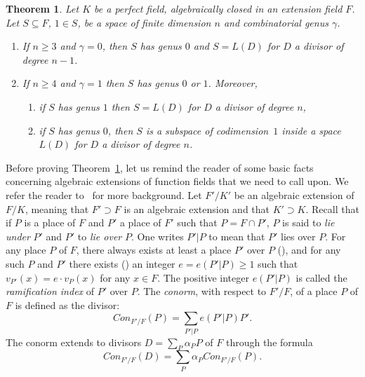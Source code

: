 \documentclass[10pt]{amsart}
\newtheorem{theo}{Theorem}[section]
\theoremstyle{definition}
\theoremstyle{remark}
\renewcommand{\geq}{\geqslant}
\begin{document}
\begin{theo}\label{thm:perfect}
Let $K$ be a perfect field, algebraically closed in an extension field $F$. Let $S \subseteq F$, $1\in S$, be a space of finite dimension $n$ and combinatorial genus $\gamma$.
\begin{enumerate}
\item \label{9.1} If $n\geq3$ and $\gamma=0$, then $S$ has genus $0$ and $S=L(D)$ for $D$ a divisor of degree $n-1$.
\item \label{9.2} If $n\geq4$ and $\gamma=1$ then $S$ has genus $0$ or $1$. Moreover,
\begin{enumerate}
\item if $S$ has genus $1$ then $S=L(D)$ for $D$ a divisor of degree $n$,
\item if $S$ has genus $0$, then $S$ is a subspace of codimension~$1$ inside a space $L(D)$ for $D$ a divisor of degree $n$.
\end{enumerate}
\end{enumerate}
\end{theo}

Before proving Theorem~\ref{thm:perfect}, let us remind the reader of some basic facts concerning algebraic extensions of function fields that we need to call upon. We refer the reader to~\cite[Chapter~III]{Stichtenoth} for more background. Let $F'/K'$ be an algebraic extension of $F/K$, meaning that $F'\supset F$ is an algebraic extension and that $K'\supset K$. Recall that if $P$ is a place of $F$ and $P'$ a place of $F'$ such that $P=F\cap P'$, $P$ is said to \emph{lie under} $P'$ and $P'$ to \emph{lie over} $P$. One writes $P'|P$ to mean that $P'$ lies over $P$. For any place $P$ of $F$, there always exists at least a place $P'$ over $P$ (\cite[Proposition~III.1.7]{Stichtenoth}), and for any such $P$ and $P'$ there exists (\cite[Proposition~III.1.4]{Stichtenoth}) an integer $e=e(P'|P)\geq1$ such that $v_{P'}(x)=e\cdot v_P(x)$ for any $x\in F$. The positive integer $e(P'|P)$ is called the \emph{ramification index} of $P'$ over $P$. The \emph{conorm}, with respect to $F'/F$, of a place $P$ of $F$ is defined as the divisor:
\[
Con_{F'/F}(P)=\sum_{P'|P}e(P'|P)P'.
\]
The conorm extends to divisors $D=\sum_P\alpha_PP$ of $F$ through the formula
\[
Con_{F'/F}(D)=\sum_P\alpha_P Con_{F'/F}(P).
\]
\end{document}
